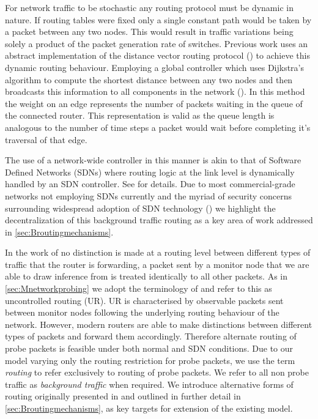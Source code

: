 For network traffic to be stochastic any routing protocol must be dynamic in nature. If routing tables were fixed only a single constant path would be taken by a packet between any two nodes. This would result in traffic variations being solely a product of the packet generation rate of switches. Previous work uses an abstract implementation of the distance vector routing protocol (\cite{perkins_ad_2003}) to achieve this dynamic routing behaviour. Employing a global controller which uses Dijkstra's algorithm to compute the shortest distance between any two nodes and then broadcasts this information to all components in the network (\cite{barnes_stochastic_2020}). In this method the weight on an edge represents the number of packets waiting in the queue of the connected router. This representation is valid as the queue length is analogous to the number of time steps a packet would wait before completing it’s traversal of that edge.\par
The use of a network-wide controller in this manner is akin to that of Software Defined Networks (SDNs) where routing logic at the link level is dynamically handled by an SDN controller. See \cite{kreutz_software-defined_2015} for details. Due to most commercial-grade networks not employing SDNs currently and the myriad of security concerns surrounding widespread adoption of SDN technology (\cite{wood_scalable_2021}) we highlight the decentralization of this background traffic routing as a key area of work addressed in \cref{sec:Broutingmechanisms}.\par
In the work of \cite{barnes_stochastic_2020} no distinction is made at a routing level between different types of traffic that the router is forwarding, a packet sent by a monitor node that we are able to draw inference from is treated identically to all other packets. As in \cref{sec:Mnetworkprobing} we adopt the terminology of \cite{he_network_2021} and refer to this as uncontrolled routing (UR). UR is characterised by observable packets sent between monitor nodes following the underlying routing behaviour of the network. However, modern routers are able to make distinctions between different types of packets and forward them accordingly. Therefore alternate routing of probe packets is feasible under both normal and SDN conditions. Due to our model varying only the routing restriction for probe packets, we use the term \textit{routing} to refer exclusively to routing of probe packets. We refer to all non probe traffic as \textit{background traffic} when required. We introduce alternative forms of routing originally presented in \cite{he_network_2021} and outlined in further detail in \cref{sec:Broutingmechanisms}, as key targets for extension of the existing model.

